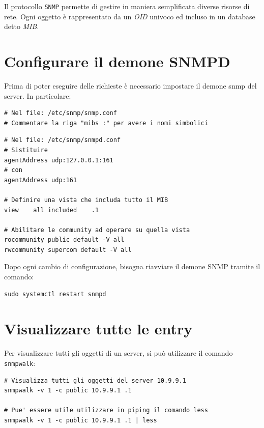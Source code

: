 \documentclass[a4paper]{report}
\newenvironment{ricordati}{\begin{tcolorbox}[fonttitle=\sffamily\bfseries\large,title=Ricordati,colframe=orange!75!white]}{\end{tcolorbox}}
\newenvironment{code}{\begin{tcolorbox}[size=small]}{\end{tcolorbox}}
\begin{document}
Il protocollo \texttt{SNMP} permette di gestire in maniera semplificata diverse risorse di rete. Ogni oggetto è rappresentato da un \textit{OID} univoco ed incluso in un database detto \textit{MIB}.

\section{Configurare il demone SNMPD}

Prima di poter eseguire delle richieste è necessario impostare il demone snmp del server. In particolare:

\begin{code}
\begin{lstlisting}
# Nel file: /etc/snmp/snmp.conf
# Commentare la riga "mibs :" per avere i nomi simbolici
\end{lstlisting}
\end{code}

\begin{code}
\begin{lstlisting}
# Nel file: /etc/snmp/snmpd.conf
# Sistituire
agentAddress udp:127.0.0.1:161
# con
agentAddress udp:161

# Definire una vista che includa tutto il MIB
view	all	included 	.1

# Abilitare le community ad operare su quella vista
rocommunity public default -V all
rwcommunity supercom default -V all
\end{lstlisting}
\end{code}

\begin{ricordati}
	Dopo ogni cambio di configurazione, bisogna riavviare il demone SNMP tramite il comando:
	\begin{lstlisting}
sudo systemctl restart snmpd
	\end{lstlisting}
\end{ricordati}

\section{Visualizzare tutte le entry}

Per visualizzare tutti gli oggetti di un server, si può utilizzare il comando \texttt{snmpwalk}:

\begin{code}
\begin{lstlisting}
# Visualizza tutti gli oggetti del server 10.9.9.1
snmpwalk -v 1 -c public 10.9.9.1 .1

# Pue' essere utile utilizzare in piping il comando less
snmpwalk -v 1 -c public 10.9.9.1 .1 | less
\end{lstlisting}
\end{code}
\end{document}
